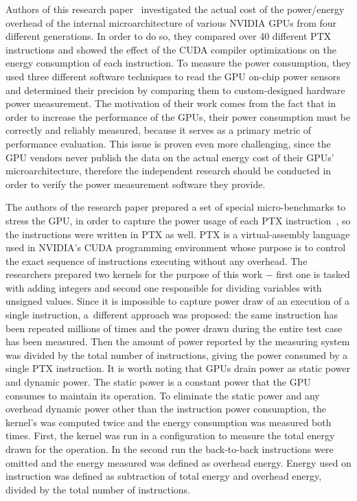 Authors of this research paper~\cite{State_of_the_Art_Article_2}
investigated the actual cost of the power/energy overhead of
the internal microarchitecture of various NVIDIA GPUs from
four different generations. In order to do so, they compared
over 40 different PTX instructions and showed the effect of
the CUDA compiler optimizations on the energy consumption of
each instruction. To measure the power consumption, they used
three different software techniques to read the GPU on-chip
power sensors and determined their precision by comparing them
to custom-designed hardware power measurement.
The motivation of their work comes from the fact that in order
to increase the performance of the GPUs, their power consumption
must be correctly and reliably measured, because it serves as
a primary metric of performance evaluation. This issue is proven
even more challenging, since the GPU vendors never publish the
data on the actual energy cost of their GPUs' microarchitecture,
therefore the independent research should be conducted in order
to verify the power measurement software they provide.

The authors of the research paper prepared a set of special
micro-benchmarks to stress the GPU, in order to capture the
power usage of each PTX
instruction~\cite{NVIDIA_Parallel_Thread_Execution}, so the
instructions were written in PTX as well. PTX is a virtual-assembly
language used in NVIDIA's CUDA programming environment whose purpose
is to control the exact sequence of instructions executing without
any overhead. The researchers prepared two kernels for the purpose
of this work $-$ first one is tasked with adding integers and second
one responsible for dividing variables with unsigned values.
Since it is impossible to capture power draw of an execution of
a single instruction, a~different approach was proposed: the same
instruction has been repeated millions of times and the power
drawn during the entire test case has been measured. Then the
amount of power reported by the measuring system was divided by
the total number of instructions, giving the power consumed by
a single PTX instruction. It is worth noting that GPUs drain
power as static power and dynamic power. The static power is
a constant power that the GPU consumes to maintain its operation.
To eliminate the static power and any overhead dynamic power
other than the instruction power consumption, the kernel's was
computed twice and the energy consumption was measured both times.
First, the kernel was run in a configuration to measure the total
energy drawn for the operation. In the second run the back-to-back
instructions were omitted and the energy measured was defined as
overhead energy. Energy used on instruction was defined as
subtraction of total energy and overhead energy, divided by the
total number of instructions.

